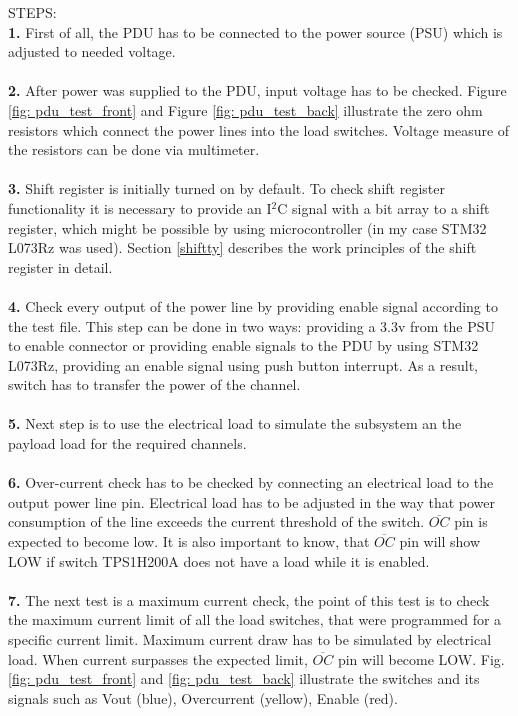 STEPS:\\
\textbf{1.}  First of all, the PDU has to be connected to the power source (PSU) which is adjusted to needed voltage.\\ \\
\textbf{2.} After power was supplied to the PDU, input voltage has to be checked. Figure \ref{fig: pdu_test_front} and Figure \ref{fig: pdu_test_back} illustrate the zero ohm resistors which connect the power lines into the load switches. Voltage measure of the resistors can be done via multimeter. \\ \\
\textbf{3.} Shift register is initially turned on by default. To check shift register functionality it is necessary to provide an I$^2$C signal with a bit array to a shift register, which might be possible by using microcontroller (in my case STM32 L073Rz was used). Section \ref{shiftty} describes the work principles of the shift register in detail. \\ \\
\textbf{4.} Check every output of the power line by providing enable signal according  to the test file. This step can be done in two ways: providing a 3.3v from the PSU to enable connector or providing enable signals to the PDU by using STM32 L073Rz, providing an enable signal using push button interrupt. As a result, switch has to transfer the power of the channel.\\ \\
\textbf{5.} Next step is to use the electrical load to simulate the subsystem an the payload load for the required channels.\\ \\
\textbf{6.} Over-current check has to be checked by connecting an electrical load to the output power line pin. Electrical load has to be adjusted in the way that power consumption of the line exceeds the current threshold of the switch. $\overline{OC}$ pin is expected to become low.
It is also important to know, that $\overline{OC}$ pin will show LOW if switch TPS1H200A does not have a load while it is enabled.\\ \\
\textbf{7.} The next test is a maximum current check, the point of this test is to check the maximum current limit of all the load switches, that were programmed for a
specific current limit. Maximum current draw has to be simulated by electrical load. When current surpasses the expected
limit, $\overline{OC}$ pin will become LOW.
Fig.\ref{fig: pdu_test_front} and \ref{fig: pdu_test_back} illustrate the switches and its signals such as Vout (blue), Overcurrent (yellow), Enable (red).

